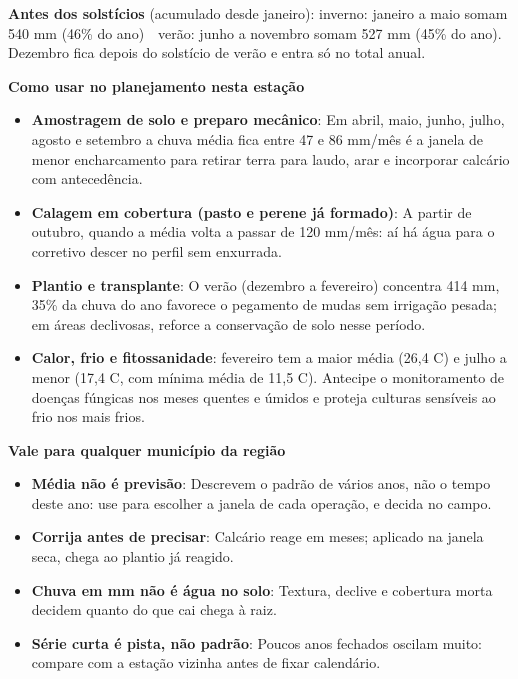 \documentclass[10pt,a4paper]{article}
\begin{document}
\vspace{1pt}
{\footnotesize\textbf{Antes dos solstícios} (acumulado desde janeiro):
inverno: janeiro a maio somam 540 mm (46\% do ano) \,\textbullet\, verão: junho a novembro somam 527 mm (45\% do ano). Dezembro fica depois do solstício de verão e entra só no total
anual.}

\vspace{2pt}
{\bfseries\small Como usar no planejamento nesta estação}

\footnotesize\begin{itemize}\setlength{\itemsep}{0.5pt}
  \item \textbf{Amostragem de solo e preparo mecânico}: Em abril, maio, junho, julho, agosto e setembro a chuva média fica entre 47 e 86 mm/mês \textemdash{} é a janela de menor encharcamento para retirar terra para laudo, arar e incorporar calcário com antecedência.
  \item \textbf{Calagem em cobertura (pasto e perene já formado)}: A partir de outubro, quando a média volta a passar de 120 mm/mês: aí há água para o corretivo descer no perfil sem enxurrada.
  \item \textbf{Plantio e transplante}: O verão (dezembro a fevereiro) concentra 414 mm, 35\% da chuva do ano \textemdash{} favorece o pegamento de mudas sem irrigação pesada; em áreas declivosas, reforce a conservação de solo nesse período.
  \item \textbf{Calor, frio e fitossanidade}: fevereiro tem a maior média (26,4 \textdegree{}C) e julho a menor (17,4 \textdegree{}C, com mínima média de 11,5 \textdegree{}C). Antecipe o monitoramento de doenças fúngicas nos meses quentes e úmidos e proteja culturas sensíveis ao frio nos mais frios.
\end{itemize}

\vspace{1pt}
{\bfseries\small Vale para qualquer município da região}

\scriptsize\begin{itemize}\setlength{\itemsep}{0.5pt}
  \item \textbf{Média não é previsão}: Descrevem o padrão de vários anos, não o tempo deste ano: use para escolher a janela de cada operação, e decida no campo.
  \item \textbf{Corrija antes de precisar}: Calcário reage em meses; aplicado na janela seca, chega ao plantio já reagido.
  \item \textbf{Chuva em mm não é água no solo}: Textura, declive e cobertura morta decidem quanto do que cai chega à raiz.
  \item \textbf{Série curta é pista, não padrão}: Poucos anos fechados oscilam muito: compare com a estação vizinha antes de fixar calendário.
\end{itemize}
\end{document}

